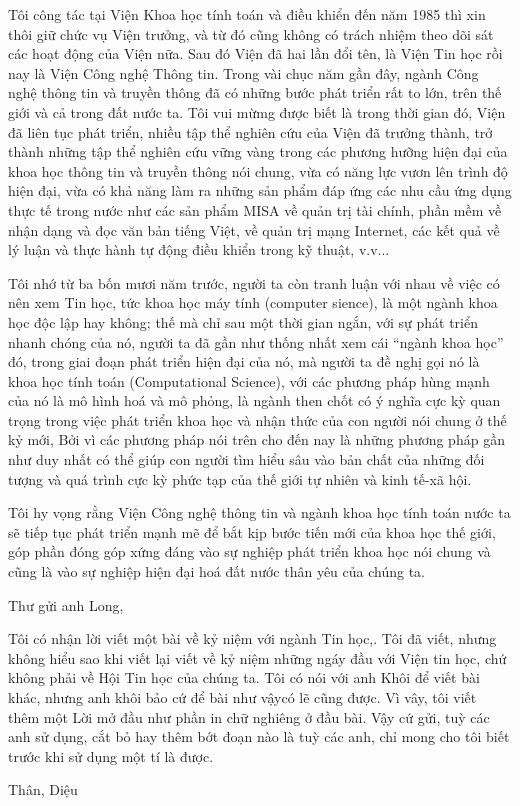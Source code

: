             Tôi công tác tại Viện Khoa học tính toán và điều khiển đến năm 1985 thì xin thôi giữ chức vụ Viện trưởng, và từ đó cũng không có trách nhiệm theo dõi sát các hoạt động của Viện nữa. Sau đó Viện đã hai lần đổi tên, là Viện Tin học rồi nay là Viện Công nghệ Thông tin. Trong vài chục năm gần đây, ngành Công nghệ thông tin và truyền thông đã có những bước phát triển rất to lớn, trên thế giới và cả trong đất nước ta. Tôi vui mừmg được biết là trong thời gian đó, Viện đã liên tục phát triển, nhiều tập thể nghiên cứu của Viện đã trưởng thành, trở thành những tập thể nghiên cứu vững vàng trong các phương hưỡng hiện đại của khoa học thông tin và truyền thông nói chung, vừa có năng lực vươn lên trình độ hiện đại, vừa có khả năng làm ra những sản phẩm đáp ứng các nhu cầu ứng dụng thực tế trong nước như các sản phẩm MISA về quản trị tài chính, phần mềm về nhận dạng và đọc văn bản tiếng Việt, về quản trị mạng Internet, các kết quả về lý luận và thực hành tự động điều khiển trong kỹ thuật, v.v...
            
            Tôi nhớ từ ba bốn mươi năm trước, người ta còn tranh luận với nhau về việc có nên xem Tin học, tức khoa học máy tính (computer sience), là một ngành khoa học độc lập hay không; thế mà chỉ sau một thời gian ngắn, với sự phát triển nhanh chóng của nó, người ta đã gần như thống nhất xem cái “ngành khoa học” đó, trong giai đoạn phát triển hiện đại của nó, mà người ta đề nghị gọi nó là khoa học tính toán (Computational Science), với các phương pháp hùng mạnh của nó là mô hình hoá và mô phỏng, là ngành then chốt có ý nghĩa cực kỳ quan trọng trong việc phát triển khoa học và nhận thức của con người nói chung ở thế kỷ mới, Bởi vì các phương pháp nói trên cho đến nay là những phương pháp gần như duy nhất có thể giúp con người tìm hiểu sâu vào bản chất của những đối tượng và quá trình cực kỳ phức tạp của thế giới tự nhiên và kinh tế-xã hội.
            
Tôi hy vọng rằng Viện Công nghệ thông tin và ngành khoa học tính toán nước ta sẽ tiếp tục phát triển mạnh mẽ để bắt kịp bước tiến mới của khoa học thế giới, góp phần đóng góp xứng đáng vào sự nghiệp phát triển khoa học nói chung và cũng là vào sự nghiệp hiện đại hoá đất nước thân yêu của chúng ta.

Thư gửi anh Long,

Tôi có nhận lời viết một bài về kỷ niệm với ngành Tin học,. Tôi đã viết, nhưng không hiểu sao khi viết lại viết về kỷ niệm những ngáy đầu với Viện tin học, chứ không phải về Hội Tin học của chúng ta. Tôi có nói với anh Khôi để viết bài khác, nhưng anh khôi bảo cứ để bài như vậycó lẽ cũng được. Vì vây, tôi viết thêm một Lời mở đầu như  phần in chữ nghiêng ở đầu bài. Vậy cứ gửi, tuỳ các anh sử dụng, cắt bỏ hay thêm bớt đoạn nào là tuỳ các anh, chỉ mong cho tôi biết trước khi sử dụng một tí là được.

Thân, Diệu